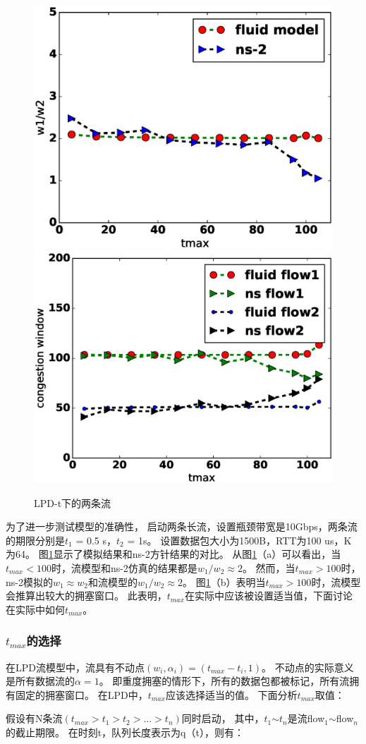\begin{figure}[h]
\centering
{}
 {\includegraphics[width=0.45\columnwidth]{figures/LPD/parameter/ratio.eps}}
{\includegraphics[width=0.45\columnwidth]{figures/LPD/parameter/window2.eps}}
\caption{LPD-t下的两条流}
\label{rate-ratio-fig}
\end{figure}



为了进一步测试模型的准确性，
启动两条长流，设置瓶颈带宽是10Gbps，两条流的期限分别是$t_1$ = 0.5 s，$t_2$ = 1s。
设置数据包大小为1500B，RTT为100 us，K为64。
图\ref{rate-ratio-fig}显示了模拟结果和ns-2方针结果的对比。
从图\ref{rate-ratio-fig}（a）可以看出，当$t_{max} <100$时，流模型和ns-2仿真的结果都是$w_1 /w_2 \approx 2$。
然而，当$t_{max}> 100$时，ns-2模拟的$w_1\approx w_2$和流模型的$w_1 /w_2 \approx  2$。
图\ref{rate-ratio-fig}（b）表明当$t_{max}> 100$时，流模型会推算出较大的拥塞窗口。
此表明，$t_{max}$在实际中应该被设置适当值，下面讨论在实际中如何$t_{max}$。



\subsubsection{$t_{max}$的选择}
在LPD流模型中，流具有不动点$(w_i,\alpha_i)=(t_{max}-t_i,1)$。
不动点的实际意义是所有数据流的$\alpha= 1$。
即重度拥塞的情形下，所有的数据包都被标记，所有流拥有固定的拥塞窗口。
在LPD中，$t_{max}$应该选择适当的值。
下面分析$t_{max}$取值：

假设有N条流$(t_{max}> t_1> t_2> ...> t_n)$同时启动，
其中，$t_1$$\sim$$t_n$是流flow$_1$$\sim$flow$_n$的截止期限。
在时刻t，队列长度表示为q（t），则有：

